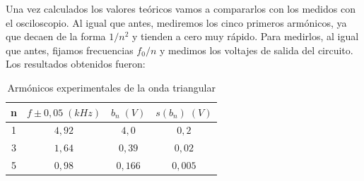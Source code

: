 \documentclass[a4paper,12pt,titlepage]{article}
\begin{document}
Una vez calculados los valores teóricos vamos a compararlos con los medidos con el osciloscopio. Al igual que antes, mediremos los cinco primeros armónicos, ya que decaen de la forma $1/n^2$ y tienden a cero muy rápido. Para medirlos, al igual que antes, fijamos frecuencias $f_0/n$ y medimos los voltajes de salida del circuito. Los resultados obtenidos fueron:

\begin{table}[h!]
\centering
\begin{tabular}{|c|c|c|c|}
\hline
n & $f \pm 0,05 \; (kHz)$ & $b_n \;(V)$ & $s(b_n) \; (V)$ \\ \hline
1 & $4,92$ & $4,0$& $0,2$   \\ \hline
3 & $1,64$ &  $0,39$& $0,02$   \\ \hline
5 & $0,98$ &  $0,166$& $0,005$  \\ \hline
\end{tabular}
\caption{Armónicos experimentales de la onda triangular}
\label{tab:my-table}
\end{table}
\end{document}
